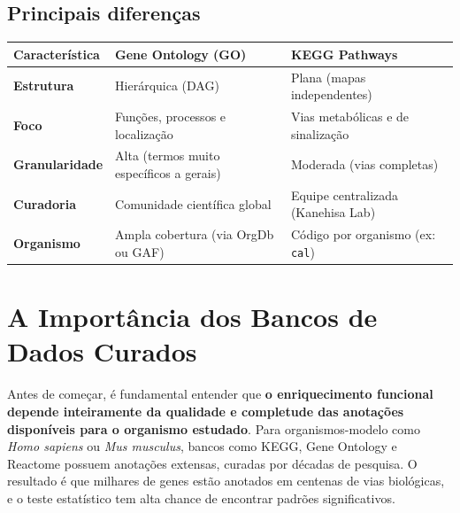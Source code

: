 \documentclass[
  letterpaper,
  DIV=11,
  numbers=noendperiod]{scrreprt}
\newcounter{none} %
\begin{document}
\subsection{Principais diferenças}\label{principais-diferenuxe7as}

{\def\LTcaptype{none} %
\begin{longtable}[]{@{}
  >{\raggedright\arraybackslash}p{}
  >{\raggedright\arraybackslash}p{}
  >{\raggedright\arraybackslash}p{}@{}}
\toprule\noalign{}
\begin{minipage}[b]{\linewidth}\raggedright
Característica
\end{minipage} & \begin{minipage}[b]{\linewidth}\raggedright
Gene Ontology (GO)
\end{minipage} & \begin{minipage}[b]{\linewidth}\raggedright
KEGG Pathways
\end{minipage} \\
\midrule\noalign{}
\endhead
\bottomrule\noalign{}
\endlastfoot
\textbf{Estrutura} & Hierárquica (DAG) & Plana (mapas independentes) \\
\textbf{Foco} & Funções, processos e localização & Vias metabólicas e de
sinalização \\
\textbf{Granularidade} & Alta (termos muito específicos a gerais) &
Moderada (vias completas) \\
\textbf{Curadoria} & Comunidade científica global & Equipe centralizada
(Kanehisa Lab) \\
\textbf{Organismo} & Ampla cobertura (via OrgDb ou GAF) & Código por
organismo (ex: \texttt{cal}) \\
\end{longtable}
}

\section{A Importância dos Bancos de Dados
Curados}\label{a-importuxe2ncia-dos-bancos-de-dados-curados}

Antes de começar, é fundamental entender que \textbf{o enriquecimento
funcional depende inteiramente da qualidade e completude das anotações
disponíveis para o organismo estudado}. Para organismos-modelo como
\emph{Homo sapiens} ou \emph{Mus musculus}, bancos como KEGG, Gene
Ontology e Reactome possuem anotações extensas, curadas por décadas de
pesquisa. O resultado é que milhares de genes estão anotados em centenas
de vias biológicas, e o teste estatístico tem alta chance de encontrar
padrões significativos.
\end{document}
